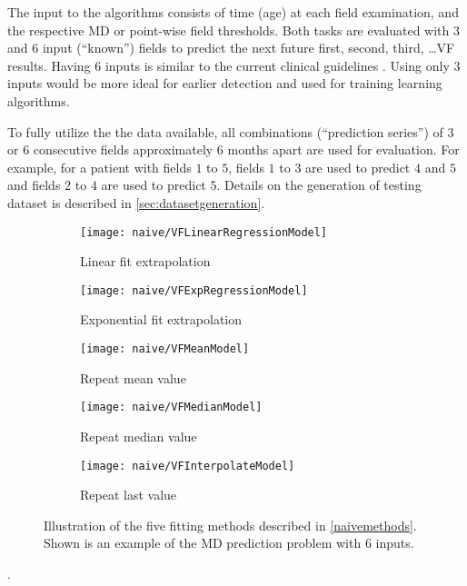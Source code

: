 The input to the algorithms consists of time (age) at each field examination, and the respective \ac{MD} or point-wise field thresholds. Both tasks are evaluated with $3$ and $6$ input (``known'') fields to predict the next future first, second, third, \dots \acl{VF} results. Having $6$ inputs is similar to the current clinical guidelines \cite{Chauhan2008}. Using only $3$ inputs would be more ideal for earlier detection and used for training learning algorithms. 

To fully utilize the the data available, all combinations (``prediction series'') of $3$ or $6$ consecutive fields approximately $6$ months apart are used for evaluation. For example, for a patient with fields $1$ to $5$, fields $1$ to $3$ are used to predict $4$ and $5$ and fields $2$ to $4$ are used to predict $5$. Details on the generation of testing dataset is described in \cref{sec:datasetgeneration}.

\begin{figure}[p]
	\centering
	\begin{subfigure}[b]{0.49\textwidth}
		\centering
		\texttt{[image: naive/VFLinearRegressionModel]}
		\caption{Linear fit extrapolation}
	\end{subfigure}
	\hfill
	\begin{subfigure}[b]{0.49\textwidth}
		\centering
		\texttt{[image: naive/VFExpRegressionModel]}
		\caption{Exponential fit extrapolation}
	\end{subfigure}
	\hfill
	\begin{subfigure}[b]{0.49\textwidth}
		\centering
		\texttt{[image: naive/VFMeanModel]}
		\caption{Repeat mean value}
	\end{subfigure}
	\hfill
	\begin{subfigure}[b]{0.49\textwidth}
		\centering
		\texttt{[image: naive/VFMedianModel]}
		\caption{Repeat median value}
	\end{subfigure}
	\hfill
	\begin{subfigure}[b]{0.49\textwidth}
		\centering
		\texttt{[image: naive/VFInterpolateModel]}
		\caption{Repeat last value}
	\end{subfigure}
	\caption[Illustration of the five fitting methods]{Illustration of the five fitting methods described in \cref{naivemethods}. Shown is an example of the \ac{MD} prediction problem with 6 inputs.}
\end{figure}. 


